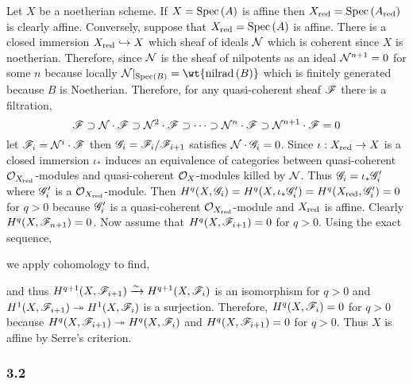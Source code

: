 \documentclass[12pt]{article}
\begin{document}
Let $X$ be a noetherian scheme. If $X = \mathrm{Spec}\left( A \right)$ is affine then $X_{\mathrm{red}} = \mathrm{Spec}\left( A_{\mathrm{red}} \right)$ is clearly affine. Conversely, suppose that $X_{\mathrm{red}} = \mathrm{Spec}\left( A \right)$ is affine. There is a closed immersion $X_{\mathrm{red}} \hookrightarrow X$ which sheaf of ideals $\mathcal{N}$ which is coherent since $X$ is noetherian. Therefore, since $\mathcal{N}$ is the sheaf of nilpotents as an ideal $\mathcal{N}^{n+1} = 0$ for some $n$ because locally $\sN |_{\Spec{B}} = \wt{\nilrad{B}}$ which is finitely generated because $B$ is Noetherian. Therefore, for any quasi-coherent sheaf $\mathscr{F}$ there is a filtration,
\[ \mathscr{F} \supset \mathcal{N} \cdot \mathscr{F} \supset \mathcal{N}^2 \cdot \mathscr{F} \supset \cdots \supset \mathcal{N}^n \cdot \mathscr{F} \supset \mathcal{N}^{n+1} \cdot \mathscr{F} = 0 \]
let $\mathscr{F}_i = \mathcal{N}^i \cdot \mathscr{F}$ then $\mathscr{G}_i = \mathscr{F}_i / \mathscr{F}_{i+1}$ satisfies $\mathcal{N} \cdot \mathscr{G}_i = 0$. Since $\iota : X_{\mathrm{red}} \to X$ is a closed immersion $\iota_*$ induces an equivalence of categories between quasi-coherent $\mathcal{O}_{X_{\mathrm{red}}}$-modules and quasi-coherent $\mathcal{O}_{X}$-modules killed by $\mathcal{N}$. Thus $\mathscr{G}_i = \iota_* \mathscr{G}_i'$ where $\mathscr{G}_i'$ is a $\mathcal{O}_{X_{\mathrm{red}}}$-module. Then $H^q(X, \mathscr{G}_i) = H^q(X, \iota_* \mathscr{G}_i') = H^q(X_{\mathrm{red}}, \mathscr{G}_i') = 0$ for $q > 0$ because $\mathscr{G}_i'$ is a quasi-coherent $\mathcal{O}_{X_{\mathrm{red}}}$-module and $X_{\mathrm{red}}$ is affine. Clearly $H^q(X, \mathscr{F}_{n+1}) = 0$. Now assume that $H^q(X, \mathscr{F}_{i+1}) = 0$ for $q > 0$. Using the exact sequence,
\begin{center}
\end{center}
we apply cohomology to find,
\begin{center}
\end{center}
and thus $H^{q+1}(X, \mathscr{F}_{i+1}) \xrightarrow{\sim} H^{q+1}(X, \mathscr{F}_{i})$ is an isomorphism for $q > 0$ and $H^1(X, \mathscr{F}_{i+1}) \twoheadrightarrow H^1(X, \mathscr{F}_i)$ is a surjection. Therefore, $H^q(X, \mathscr{F}_i) = 0$ for $q > 0$ because $H^q(X, \mathscr{F}_{i+1}) \twoheadrightarrow H^q(X, \mathscr{F}_{i})$ and $H^q(X, \mathscr{F}_{i+1}) = 0$ for $q > 0$. Thus $X$ is affine by Serre's criterion.

\subsubsection{3.2}
\end{document}
